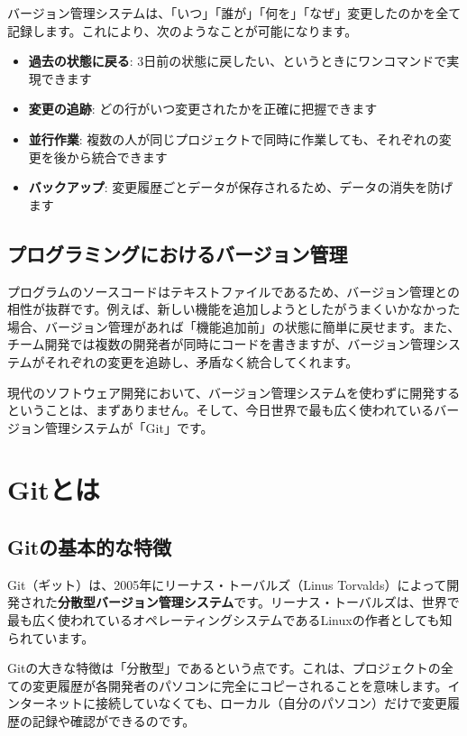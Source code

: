 バージョン管理システムは、「いつ」「誰が」「何を」「なぜ」変更したのかを全て記録します。これにより、次のようなことが可能になります。

\begin{itemize}
  \item \textbf{過去の状態に戻る}: 3日前の状態に戻したい、というときにワンコマンドで実現できます
  \item \textbf{変更の追跡}: どの行がいつ変更されたかを正確に把握できます
  \item \textbf{並行作業}: 複数の人が同じプロジェクトで同時に作業しても、それぞれの変更を後から統合できます
  \item \textbf{バックアップ}: 変更履歴ごとデータが保存されるため、データの消失を防げます
\end{itemize}

\subsection{プログラミングにおけるバージョン管理}

プログラムのソースコードはテキストファイルであるため、バージョン管理との相性が抜群です。例えば、新しい機能を追加しようとしたがうまくいかなかった場合、バージョン管理があれば「機能追加前」の状態に簡単に戻せます。また、チーム開発では複数の開発者が同時にコードを書きますが、バージョン管理システムがそれぞれの変更を追跡し、矛盾なく統合してくれます。

現代のソフトウェア開発において、バージョン管理システムを使わずに開発するということは、まずありません。そして、今日世界で最も広く使われているバージョン管理システムが「Git」です。

\section{Gitとは}

\subsection{Gitの基本的な特徴}

Git（ギット）は、2005年にリーナス・トーバルズ（Linus Torvalds）によって開発された\textbf{分散型バージョン管理システム}です。リーナス・トーバルズは、世界で最も広く使われているオペレーティングシステムであるLinuxの作者としても知られています。

Gitの大きな特徴は「分散型」であるという点です。これは、プロジェクトの全ての変更履歴が各開発者のパソコンに完全にコピーされることを意味します。インターネットに接続していなくても、ローカル（自分のパソコン）だけで変更履歴の記録や確認ができるのです。

